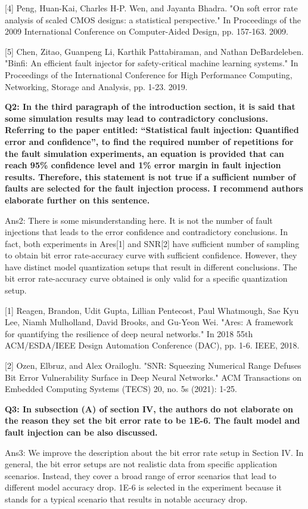 [4] Peng, Huan-Kai, Charles H-P. Wen, and Jayanta Bhadra. "On soft error rate analysis of scaled CMOS designs: a statistical perspective." In Proceedings of the 2009 International Conference on Computer-Aided Design, pp. 157-163. 2009.

[5] Chen, Zitao, Guanpeng Li, Karthik Pattabiraman, and Nathan DeBardeleben. "Binfi: An efficient fault injector for safety-critical machine learning systems." In Proceedings of the International Conference for High Performance Computing, Networking, Storage and Analysis, pp. 1-23. 2019.

\textbf{Q2: In the third paragraph of the introduction section, it is said that some simulation results may lead to contradictory conclusions. Referring to the paper entitled: “Statistical fault injection: Quantified error and confidence”, to find the required number of repetitions for the fault simulation experiments, an equation is provided that can reach 95\% confidence level and 1\% error margin in fault injection results. Therefore, this statement is not true if a sufficient number of faults are selected for the fault injection process. I recommend authors elaborate further on this sentence.}

Ans2: There is some misunderstanding here. It is not the number of fault injections that leads to the error confidence and contradictory conclusions. In fact, both experiments in Ares[1] and SNR[2] have sufficient number of sampling to obtain bit error rate-accuracy curve with sufficient confidence. However, they have distinct model quantization setups that result in different conclusions. The bit error rate-accuracy curve obtained is only valid for a specific quantization setup. 

[1] Reagen, Brandon, Udit Gupta, Lillian Pentecost, Paul Whatmough, Sae Kyu Lee, Niamh Mulholland, David Brooks, and Gu-Yeon Wei. "Ares: A framework for quantifying the resilience of deep neural networks." In 2018 55th ACM/ESDA/IEEE Design Automation Conference (DAC), pp. 1-6. IEEE, 2018.

[2] Ozen, Elbruz, and Alex Orailoglu. "SNR: Squeezing Numerical Range Defuses Bit Error Vulnerability Surface in Deep Neural Networks." ACM Transactions on Embedded Computing Systems (TECS) 20, no. 5s (2021): 1-25.

\textbf{Q3: In subsection (A) of section IV, the authors do not elaborate on the reason they set the bit error rate to be 1E-6. The fault model and fault injection can be also discussed.}

Ans3: We improve the description about the bit error rate setup in Section IV. In general, the bit error setups are not realistic data from specific application scenarios. Instead, they cover a broad range of error scenarios that lead to different model accuracy drop. 1E-6 is selected in the experiment because it stands for a typical scenario that results in notable accuracy drop. %

